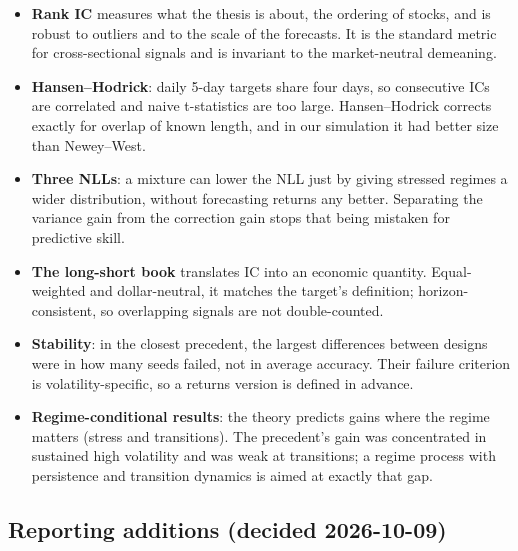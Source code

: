 \begin{whybox}
\begin{itemize}
\item \textbf{Rank IC} measures what the thesis is about, the ordering of stocks, and is robust to outliers
  and to the scale of the forecasts. It is the standard metric for cross-sectional signals and is invariant
  to the market-neutral demeaning.
\item \textbf{Hansen--Hodrick}: daily 5-day targets share four days, so consecutive ICs are correlated and naive
  t-statistics are too large. Hansen--Hodrick corrects exactly for overlap of known length, and in our
  simulation it had better size than Newey--West.
\item \textbf{Three NLLs}: a mixture can lower the NLL just by giving stressed regimes a wider distribution,
  without forecasting returns any better. Separating the variance gain from the correction gain stops that
  being mistaken for predictive skill.
\item \textbf{The long-short book} translates IC into an economic quantity. Equal-weighted and dollar-neutral, it
  matches the target's definition; horizon-consistent, so overlapping signals are not double-counted.
\item \textbf{Stability}: in the closest precedent, the largest differences between designs were in how many
  seeds failed, not in average accuracy. Their failure criterion is volatility-specific, so a returns
  version is defined in advance.
\item \textbf{Regime-conditional results}: the theory predicts gains where the regime matters (stress and
  transitions). The precedent's gain was concentrated in sustained high volatility and was weak at
  transitions; a regime process with persistence and transition dynamics is aimed at exactly that gap.
\end{itemize}
\end{whybox}

\subsection{Reporting additions (decided 2026-10-09)}

